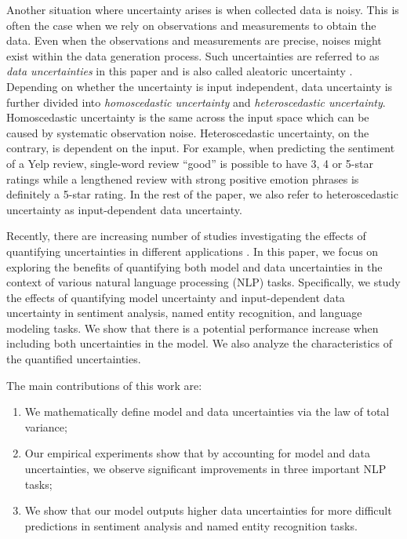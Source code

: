 \documentclass[letterpaper]{article} %
\begin{document}
Another situation where uncertainty arises is when collected data is noisy. This is often the case when we rely on observations and measurements to obtain the data. Even when the observations and measurements are precise, noises might exist within the data generation process. Such uncertainties are referred to as \textit{data uncertainties} in this paper and is also called aleatoric uncertainty \cite{der2009aleatory}. Depending on whether the uncertainty is input independent, data uncertainty is further divided into \textit{homoscedastic uncertainty} and \textit{heteroscedastic uncertainty}. Homoscedastic uncertainty is the same across the input space which can be caused by systematic observation noise. Heteroscedastic uncertainty, on the contrary, is dependent on the input. For example, when predicting the sentiment of a Yelp review, single-word review ``good'' is possible to have 3, 4 or 5-star ratings while a lengthened review with strong positive emotion phrases is definitely a 5-star rating. In the rest of the paper, we also refer to heteroscedastic uncertainty as input-dependent data uncertainty.

Recently, there are increasing number of studies investigating the effects of quantifying uncertainties in different applications \cite{kendall2015bayesian,gal2016theoretically,kendall2017uncertainties,zhu2017deep}. In this paper, we focus on exploring the benefits of quantifying both model and data uncertainties in the context of various natural language processing (NLP) tasks. Specifically, we study the effects of quantifying model uncertainty and input-dependent data uncertainty in sentiment analysis, named entity recognition, and language modeling tasks. We show that there is a potential performance increase when including both uncertainties in the model. We also analyze the characteristics of the quantified uncertainties.

The main contributions of this work are:
\begin{enumerate}
\item We mathematically define model and data uncertainties via the law of total variance;
\item Our empirical experiments show that by accounting for model and data uncertainties, we observe significant improvements in three important NLP tasks;
\item We show that our model outputs higher data uncertainties for more difficult predictions in sentiment analysis and named entity recognition tasks.
\end{enumerate}
\end{document}
